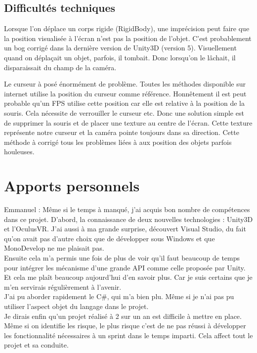 \documentclass[a4paper,11pt]{myreport}
\begin{document}
\section{Difficultés techniques}
\par Lorsque l'on déplace un corps rigide (RigidBody), une imprécision peut faire que la position visualisée à l'écran n'est pas la position de l'objet. C'est probablement un bog corrigé dans la dernière version de Unity3D (version 5). Visuellement quand on déplaçait un objet, parfois, il tombait. Donc lorsqu'on le lâchait, il disparaissait du champ de la caméra.\\
\par Le curseur à posé énormément de problème. Toutes les méthodes disponible sur internet utilise la position du curseur comme référence. Honnêtement il est peut probable qu'un FPS utilise cette position car elle est relative à la position de la souris. Cela nécessite de verrouiller le curseur etc. Donc une solution simple est de supprimer la souris et de placer une texture au centre de l'écran. Cette texture représente notre curseur et la caméra pointe toujours dans sa direction. Cette méthode à corrigé tous les problèmes liées à aux position des objets parfois houleuses.
\chapter{Apports personnels}
\par Emmanuel : Même si le temps à manqué, j'ai acquis bon nombre de compétences dans ce projet. D'abord, la connaissance de deux nouvelles technologies : Unity3D et l'OculusVR. J'ai aussi à ma grande surprise, découvert Visual Studio, du fait qu'on avait pas d'autre choix que de développer sous Windows et que MonoDevelop ne me plaisait pas.\\
Ensuite cela m'a permis une fois de plus de voir qu'il faut beaucoup de temps pour intégrer les mécanisme d'une grande API comme celle proposée par Unity. Et cela me plaît beaucoup aujourd'hui d'en savoir plus. Car je suis certains que je m'en servirais régulièrement à l'avenir.\\
J'ai pu aborder rapidement le C\#, qui m'a bien plu. Même si je n'ai pas pu utiliser l'aspect objet du langage dans le projet.\\
Je dirais enfin qu'un projet réalisé à 2 sur un an est difficile à mettre en place. Même si on identifie les risque, le plus risque c'est de ne pas réussi à développer les fonctionnalité nécessaires à un sprint dans le temps imparti. Cela affect tout le projet et sa conduite.

\listoffigures
\end{document}
